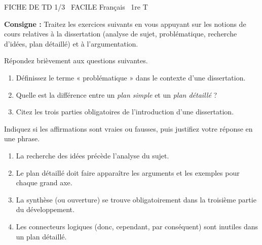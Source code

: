 \documentclass[11pt]{article}
\begin{document}
\begin{tcolorbox}[enhanced,colback=popink,colframe=popink,arc=10pt,boxrule=0pt,left=12pt,right=12pt,top=9pt,bottom=9pt]
{\color{white}\popxbold\small FICHE DE TD 1/3 \textbullet\ FACILE \hfill Français \textbullet\ 1re T\par}
\end{tcolorbox}
\vspace{4pt}
\textbf{Consigne :} Traitez les exercices suivants en vous appuyant sur les notions de cours relatives à la dissertation (analyse de sujet, problématique, recherche d'idées, plan détaillé) et à l'argumentation.

\begin{exercice}
Répondez brièvement aux questions suivantes.
\begin{enumerate}
    \item Définissez le terme « problématique » dans le contexte d'une dissertation.
    \item Quelle est la différence entre un \textit{plan simple} et un \textit{plan détaillé} ?
    \item Citez les trois parties obligatoires de l'introduction d'une dissertation.
\end{enumerate}
\end{exercice}

\begin{exercice}
Indiquez si les affirmations sont vraies ou fausses, puis justifiez votre réponse en une phrase.
\begin{enumerate}
    \item La recherche des idées précède l'analyse du sujet.
    \item Le plan détaillé doit faire apparaître les arguments et les exemples pour chaque grand axe.
    \item La synthèse (ou ouverture) se trouve obligatoirement dans la troisième partie du développement.
    \item Les connecteurs logiques (donc, cependant, par conséquent) sont inutiles dans un plan détaillé.
\end{enumerate}
\end{exercice}
\end{document}
